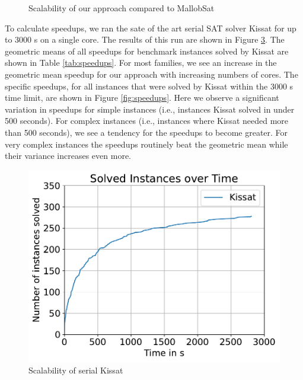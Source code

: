\documentclass[12pt,a4paper,twoside]{scrartcl}
\numberwithin{equation}{section}
\begin{document}
\begin{figure}[!h]
\begin{subfigure}[c]{.45\textwidth}
    \label{fig:runtimeCompareKis}
  \end{subfigure}
  \caption{Scalability of our approach compared to MallobSat}
  \label{fig:scale}
\end{figure}

To calculate speedups, we ran the sate of the art serial SAT solver Kissat \cite{kissat} for up to 3000 s on a single core. The results of this run are shown in Figure \ref{fig:runtimeSerial}. The geometric means of all speedups for benchmark instances solved by Kissat are shown in Table \ref{tab:speedups}. For most families, we see an increase in the geometric mean speedup for our approach with increasing numbers of cores. The specific speedups, for all instances that were solved by Kissat within the 3000 s time limit, are shown in Figure \ref{fig:speedups}. Here we observe a significant variation in speedups for simple instances (i.e., instances Kissat solved in under 500 seconds). For complex instances (i.e., instances where Kissat needed more than 500 seconds), we see a tendency for the speedups to become greater. For very complex instances the speedups routinely beat the geometric mean while their variance increases even more.

\begin{figure}[!h]
  \center
  \includegraphics[scale=.45]{plots/cumulative_runtime/scalability_serial.pdf}
  \caption{Scalability of serial Kissat}
  \label{fig:runtimeSerial}
\end{figure}
\end{document}
